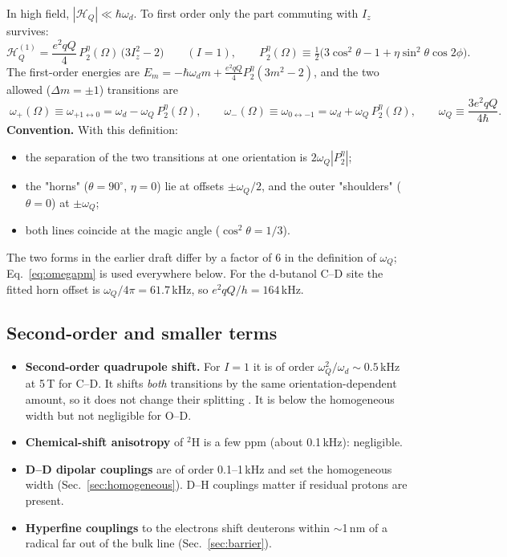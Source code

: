 \documentclass[11pt]{article}
\newcommand{\Pt}{P_2}
\begin{document}
In high field, $|\mathcal H_Q|\ll\hbar\omega_d$. To first order only the part commuting with
$I_z$ survives:
\begin{equation}
\mathcal H^{(1)}_Q=\frac{e^2qQ}{4}\,\Pt^\eta(\Omega)\,\big(3I_z^2-2\big)\qquad (I=1),
\qquad
\Pt^\eta(\Omega)\equiv \tfrac12\big(3\cos^2\theta-1+\eta\sin^2\theta\cos2\phi\big).
\end{equation}
The first-order energies are
$E_m=-\hbar\omega_d m+\tfrac{e^2qQ}{4}\Pt^\eta(3m^2-2)$, and the two allowed ($\Delta m=\pm1$)
transitions are
\begin{equation}
\boxed{\;
\omega_{+}(\Omega)\equiv\omega_{+1\leftrightarrow0}=\omega_d-\omega_Q\,\Pt^\eta(\Omega),\qquad
\omega_{-}(\Omega)\equiv\omega_{0\leftrightarrow-1}=\omega_d+\omega_Q\,\Pt^\eta(\Omega),
\qquad \omega_Q\equiv\frac{3e^2qQ}{4\hbar}.\;}
\label{eq:omegapm}
\end{equation}
\noindent\textbf{Convention.} With this definition:
\begin{itemize}
\item the separation of the two transitions at one orientation is $2\omega_Q|\Pt^\eta|$;
\item the "horns" ($\theta=90^\circ$, $\eta=0$) lie at offsets $\pm\omega_Q/2$, and the
outer "shoulders" ($\theta=0$) at $\pm\omega_Q$;
\item both lines coincide at the magic angle ($\cos^2\theta=1/3$).
\end{itemize}
The two forms in the earlier draft differ by a factor of 6 in the definition of $\omega_Q$;
Eq.~\eqref{eq:omegapm} is used everywhere below. For the d-butanol C--D site the fitted horn
offset is $\omega_Q/4\pi=61.7$\,kHz, so $e^2qQ/h=164$\,kHz.

\subsection{Second-order and smaller terms}
\begin{itemize}
\item \textbf{Second-order quadrupole shift.} For $I=1$ it is of order
$\omega_Q^2/\omega_d\sim 0.5$\,kHz at 5\,T for C--D. It shifts \emph{both} transitions by the
same orientation-dependent amount, so it does not change their splitting
\cite{CohenReif1957,Wasylishen2012}. It is below the homogeneous width but not negligible for
O--D.
\item \textbf{Chemical-shift anisotropy} of $^2$H is a few ppm (about 0.1\,kHz): negligible.
\item \textbf{D--D dipolar couplings} are of order 0.1--1\,kHz and set the homogeneous width
(Sec.~\ref{sec:homogeneous}). D--H couplings matter if residual protons are present.
\item \textbf{Hyperfine couplings} to the electrons shift deuterons within $\sim$1\,nm of a
radical far out of the bulk line (Sec.~\ref{sec:barrier}).
\end{itemize}
\end{document}
